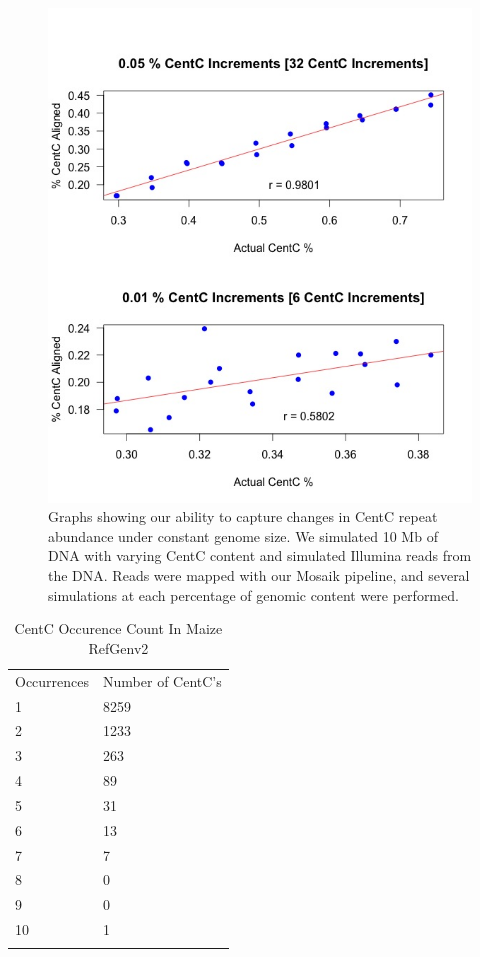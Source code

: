 \begin{figure}[h!]
\includegraphics[width=1\textwidth]{AccuracyTest_2graphs.jpeg}
\caption{Graphs showing our ability to capture changes in CentC repeat abundance under constant genome size.  We simulated 10 Mb of DNA with varying CentC content and  simulated Illumina reads from the DNA.  Reads were mapped with our Mosaik pipeline, and several simulations at each percentage of genomic content were performed.}
\label{Supp_Accuracy}    
\end{figure}

\clearpage

\begin{table}[h!]
\caption{CentC Occurence Count In Maize RefGenv2}
\label{supp.occurence}       %
\begin{tabular}{ll}
\hline\noalign{\smallskip}
Occurrences &  Number of CentC's\\
\noalign{\smallskip}\hline\noalign{\smallskip}				
1	&8259\\
2	&1233\\
3	&263\\
4	&89\\
5	&31\\
6	&13\\
7	&7\\
8	&0\\
9	&0\\
10	&1\\
\noalign{\smallskip}\hline
\end{tabular}
\end{table}


